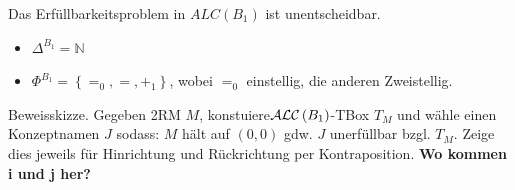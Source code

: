 Das Erfüllbarkeitsproblem in $ALC(B_{1})$ ist unentscheidbar.

\begin{itemize}
\item
  $\Delta^{B_{1}}\mathbb{= N}$
\item
  $\Phi^{B_{1}} = \left\{ =_{0}, = , +_{1} \right\}$, wobei $=_{0}$
  einstellig, die anderen Zweistellig.
\end{itemize}

Beweisskizze. Gegeben 2RM $M$,
konstuiere$\text {$\mathcal{A}\mathcal{L}\mathcal{C}$}\left( B_{1} \right)$-TBox $T_{M}$ und wähle
einen Konzeptnamen $J$ sodass: $M$ hält auf $\left( 0,0 \right)$
gdw. $J$ unerfüllbar bzgl. $T_{M}$. Zeige dies jeweils für
Hinrichtung und Rückrichtung per Kontraposition. \textbf{Wo kommen i und
j her?}